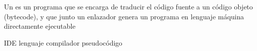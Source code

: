 
\question Un \fillin \enspace  es un programa que se encarga de traducir el código fuente a un 
código objeto (bytecode), y que junto un enlazador genera un programa en lenguaje 
máquina directamente ejecutable

  \begin{oneparchoices}
    \choice IDE
    \choice lenguaje
    \CorrectChoice compilador
    \choice pseudocódigo
  \end{oneparchoices}

